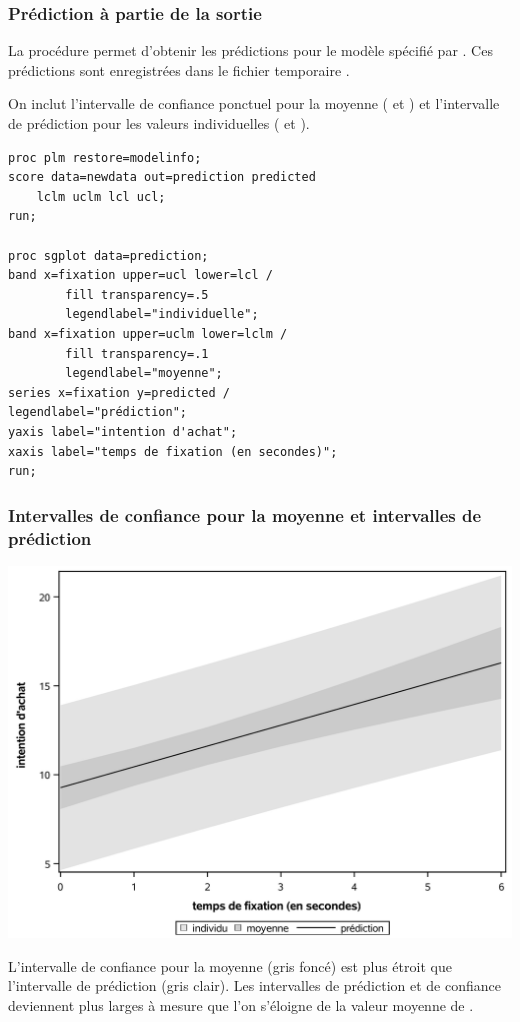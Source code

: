 \documentclass[xcolor={dvipsnames}]{beamer}
\begin{document}
\begin{frame}
\frametitle{Prédiction à partie de la sortie}
\bi 
 \item La procédure  permet d'obtenir les prédictions pour le modèle spécifié par  . Ces prédictions sont enregistrées dans le fichier temporaire .
\item On inclut l'intervalle de confiance ponctuel pour la moyenne ( et ) et l'intervalle de prédiction pour les valeurs individuelles ( et ).
\ei
\end{frame}

\begin{frame}[fragile]

\begin{tcolorbox}[colback=white, colframe=hecblue, title=Code \SASlang pour obtenir les prédictions avec \code{plm} ]
{\small 
\begin{verbatim}
proc plm restore=modelinfo; 
score data=newdata out=prediction predicted 
    lclm uclm lcl ucl; 
run;

proc sgplot data=prediction;
band x=fixation upper=ucl lower=lcl / 
        fill transparency=.5 
        legendlabel="individuelle";
band x=fixation upper=uclm lower=lclm / 
        fill transparency=.1 
        legendlabel="moyenne";
series x=fixation y=predicted / 
legendlabel="prédiction";
yaxis label="intention d'achat";
xaxis label="temps de fixation (en secondes)";
run;
\end{verbatim}
}
\end{tcolorbox}
\end{frame}


\begin{frame}[fragile]
\frametitle{Intervalles de confiance pour la moyenne et intervalles de prédiction}
\begin{center}
\includegraphics[width = 0.75\linewidth]{img/c2/diapos3-e17}
\end{center}
{\footnotesize L'intervalle de confiance pour la moyenne (gris foncé) est plus étroit que l'intervalle de prédiction (gris clair). Les intervalles de prédiction et de confiance deviennent plus larges à mesure que l'on s'éloigne de la valeur moyenne de .

}
\end{frame}
\end{document}
